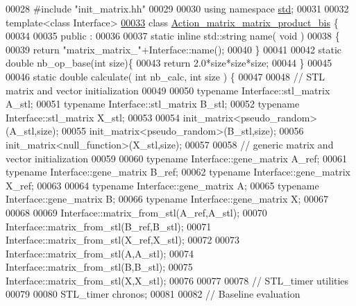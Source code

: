 \begin{DoxyCode}
00028 \textcolor{preprocessor}{#include "init\_matrix.hh"}
00029 
00030 \textcolor{keyword}{using namespace }\hyperlink{namespacestd}{std};
00031 
00032 \textcolor{keyword}{template}<\textcolor{keyword}{class} Interface>
\hyperlink{class_action__matrix__matrix__product__bis}{00033} \textcolor{keyword}{class }\hyperlink{class_action__matrix__matrix__product__bis}{Action\_matrix\_matrix\_product\_bis} \{
00034 
00035 public :
00036 
00037   \textcolor{keyword}{static} \textcolor{keyword}{inline} std::string name( \textcolor{keywordtype}{void} )
00038   \{
00039     \textcolor{keywordflow}{return} \textcolor{stringliteral}{"matrix\_matrix\_"}+Interface::name();
00040   \}
00041 
00042   \textcolor{keyword}{static} \textcolor{keywordtype}{double} nb\_op\_base(\textcolor{keywordtype}{int} size)\{
00043     \textcolor{keywordflow}{return} 2.0*size*size*size;
00044   \}
00045 
00046   \textcolor{keyword}{static} \textcolor{keywordtype}{double} calculate( \textcolor{keywordtype}{int} nb\_calc, \textcolor{keywordtype}{int} size ) \{
00047 
00048     \textcolor{comment}{// STL matrix and vector initialization}
00049 
00050     \textcolor{keyword}{typename} Interface::stl\_matrix A\_stl;
00051     \textcolor{keyword}{typename} Interface::stl\_matrix B\_stl;
00052     \textcolor{keyword}{typename} Interface::stl\_matrix X\_stl;
00053 
00054     init\_matrix<pseudo\_random>(A\_stl,size);
00055     init\_matrix<pseudo\_random>(B\_stl,size);
00056     init\_matrix<null\_function>(X\_stl,size);
00057 
00058     \textcolor{comment}{// generic matrix and vector initialization}
00059 
00060     \textcolor{keyword}{typename} Interface::gene\_matrix A\_ref;
00061     \textcolor{keyword}{typename} Interface::gene\_matrix B\_ref;
00062     \textcolor{keyword}{typename} Interface::gene\_matrix X\_ref;
00063 
00064     \textcolor{keyword}{typename} Interface::gene\_matrix A;
00065     \textcolor{keyword}{typename} Interface::gene\_matrix B;
00066     \textcolor{keyword}{typename} Interface::gene\_matrix X;
00067 
00068 
00069     Interface::matrix\_from\_stl(A\_ref,A\_stl);
00070     Interface::matrix\_from\_stl(B\_ref,B\_stl);
00071     Interface::matrix\_from\_stl(X\_ref,X\_stl);
00072 
00073     Interface::matrix\_from\_stl(A,A\_stl);
00074     Interface::matrix\_from\_stl(B,B\_stl);
00075     Interface::matrix\_from\_stl(X,X\_stl);
00076 
00077 
00078     \textcolor{comment}{// STL\_timer utilities}
00079 
00080     STL\_timer chronos;
00081 
00082     \textcolor{comment}{// Baseline evaluation}

\end{DoxyCode}
